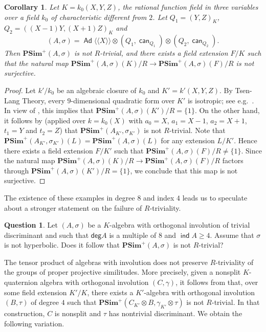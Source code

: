 \documentclass[twoside,11pt]{amsart}
\numberwithin{equation}{section}
\newtheorem{cor}[equation]{Corollary}
\theoremstyle{definition}
\newtheorem{qu}[equation]{Question}
\renewcommand{\deg}{\mathsf{deg}}
\newcommand\ind{\operatorname{\mathsf{ind}}}
\newcommand{\can}{\operatorname{\mathsf{can}}}
\newcommand{\s}{\sigma}
\newcommand{\la}{\langle}
\newcommand{\ra}{\rangle}
\newcommand{\lla}{\la\!\la}
\newcommand{\rra}{\ra\!\ra}
\renewcommand{\geq}{\geqslant}
\newcommand\Ad{\operatorname{\mathsf{Ad}}}
\begin{document}
\begin{cor}\label{C:ind4counterex} 
Let $K=k_0(X,Y,Z)$, the rational function field in three variables over a field $k_0$ of characteristic different from $2$.
Let $Q_1=(Y,Z)_K$,  $Q_2=((X-1)Y,(X+1)Z)_K$ and
$$(A,\s)=\Ad\lla X\rra\otimes (Q_1,\can_{Q_1})\otimes (Q_2,\can_{Q_2}).$$
Then $\mathbf{PSim}^+(A,\s)$ is not $R$-trivial, and there exists a field extension $F/K$ such that the natural map 
$\mathbf{PSim}^+(A,\s)(K)/R\to \mathbf{PSim}^+(A,\s)(F)/R$
is not surjective.
\end{cor}
\begin{proof}
Let $k'/k_0$ be an algebraic closure of $k_0$ and $K'=k'(X,Y,Z)$.
By Tsen-Lang Theory, every $9$-dimensional quadratic form over $K'$ is isotropic; see e.g.~\cite[Chap.~2, Cor.~15.3]{Scha85}.
In view of \cite[Theorem 7.5]{AB26}, this implies
that $\mathbf{PSim}^+(A,\s)(K')/R=\{1\}$.
On the other hand, 
it follows by  (applied over $k=k_0(X)$ with
$a_0=X$, $a_1=X-1$, $a_2=X+1$, 
$t_1=Y$ and $t_2=Z$) that $\mathbf{PSim}^+(A_{K'},\s_{K'})$ is not $R$-trivial.
Note that $\mathbf{PSim}^+(A_{K'},\s_{K'})(L)=\mathbf{PSim}^+(A,\s)(L)$ for any extension $L/K'$.
Hence there exists a field extension $F/K'$ such that 
$\mathbf{PSim}^+(A,\s)(F)/R\neq\{1\}$.
Since 
the natural map 
$\mathbf{PSim}^+(A,\s)(K)/R\to \mathbf{PSim}^+(A,\s)(F)/R$ factors through $\mathbf{PSim}^+(A,\s)(K')/R=\{1\}$, we conclude that this map is not surjective.
\end{proof}

The existence of these examples in degree $8$ and index $4$ leads us to speculate about a stronger statement on the failure of $R$-triviality.

\begin{qu}
    Let $(A,\s)$ be a $K$-algebra with orthogonal involution of trivial discriminant and such that $\deg A$ is a multiple of $8$ and $\ind A\geq 4$.
    Assume that $\s$ is not hyperbolic. Does it follow that $\mathbf{PSim}^+(A,\s)$ is not $R$-trivial?
\end{qu}

The tensor product of algebras with involution does not preserve $R$-triviality of the groups of proper projective similitudes.
More precisely, 
given a nonsplit $K$-quaternion algebra with orthogonal involution $(C,\gamma)$, it follows from \cite[Cor.~8]{BMT04} that, over some field extension $K'/K$, there exists a $K'$-algebra with orthogonal involution $(B,\tau)$ of degree $4$ such that $\mathbf{PSim}^+(C_{K'}\otimes B,\gamma_{K'}\otimes \tau)$ is not $R$-trivial. 
In that construction, $C$ is nonsplit and $\tau$ has nontrivial discriminant.
We obtain the following variation.
\end{document}

